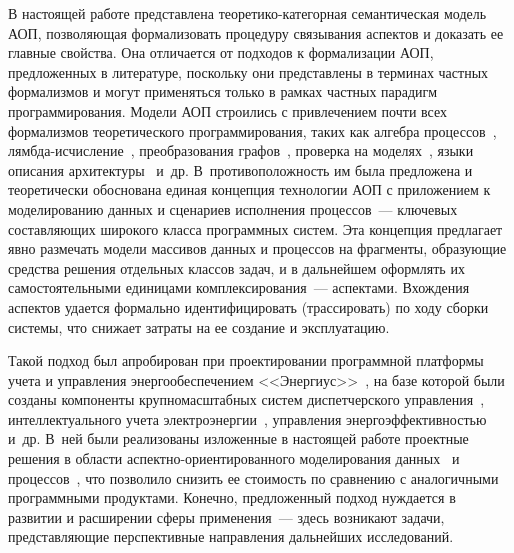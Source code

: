 \begin{multicols}{2}
   В настоящей работе представлена теоретико-ка\-те\-гор\-ная семантическая 
модель АОП, поз\-во\-ля\-ющая формализовать процедуру связывания аспектов и 
доказать ее главные свойства. Она отличается от подходов к формализации 
АОП, предложенных в литературе, поскольку они представлены в терминах 
частных формализмов и могут применяться только в рамках частных парадигм 
программирования. Модели АОП строились с привлечением почти всех 
формализмов теоретического программирования, таких как алгебра 
процессов~\cite{27-kov}, лямб\-да-ис\-чис\-ле\-ние~\cite{28-kov}, 
преобразования графов~\cite{29-kov}, проверка на моделях~\cite{30-kov}, 
языки описания архитектуры~\cite{23-kov} и~др. В~противоположность им 
была предложена и теоретически обоснована единая концепция технологии 
АОП с приложением к моделированию данных и сценариев исполнения 
процессов~--- ключевых составляющих широкого класса программных 
   сис\-тем. Эта концепция предлагает явно размечать модели массивов данных 
и процессов на фрагменты, образующие средства решения отдельных классов 
задач, и в дальнейшем оформлять их самостоятельными единицами 
   комплексирования~--- аспектами. Вхождения аспектов удается формально 
идентифицировать (трассировать) по ходу сборки системы, что снижает 
затраты на ее создание и эксплуатацию.
   
   Такой подход был апробирован при проектировании программной 
платформы учета и управления энергообеспечением 
   <<Энергиус>>~\cite{31-kov}, на базе которой были созданы компоненты 
крупномасштабных систем диспетчерского управления~\cite{18-kov}, 
интеллектуального учета электроэнергии~\cite{32-kov}, управления 
энергоэффективностью~\cite{33-kov} и~др. В~ней были реализованы 
изложенные в настоящей работе проектные решения в области 
   ас\-пект\-но-ори\-ен\-ти\-ро\-ван\-но\-го моделирования данных~\cite{18-kov} 
и процессов~\cite{20-kov}, что позволило снизить ее стоимость по сравнению с 
аналогичными программными продуктами. Конечно, предложенный подход 
нуждается в развитии и расширении сферы применения~--- здесь возникают 
задачи, представляющие перспективные направления дальнейших 
исследований.

{\small\frenchspacing
{%
\begin{thebibliography}{99}



\end{thebibliography}}}
\end{multicols}
